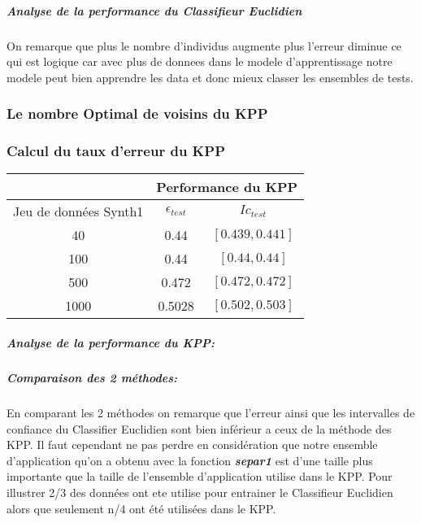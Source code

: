 \documentclass[10pt]{article}
\begin{document}
			\subparagraph{Analyse de la performance du Classifieur Euclidien}
			On remarque que plus le nombre d'individus augmente plus l'erreur diminue ce qui est logique car avec plus de donnees dans le modele d'apprentissage notre modele peut bien apprendre les data et donc mieux classer les ensembles de tests.
			 
				\subsubsection{Le nombre Optimal de voisins du KPP }
			
				\subsubsection{Calcul du taux d'erreur du KPP }
		\begin{center}		
			\begin{tabular}{ | c | c | c |}
				\rowcolor{lightgray} 
				  &  \multicolumn{2}{|c|}{Performance du KPP}\\
				
				\hline
				Jeu de données Synth1 &   $\epsilon_{test}$ &  $Ic_{test}$\\
				\hline
				\multirow{1}{*}{40}       &0.44  & $[0.439, 0.441]$ 			 \\
				
				\hline
				\multirow{1}{*}{100}      & 0.44	& $[0.44, 0.44]$  \\
				
				\hline
				\multirow{1}{*}{500}      &  0.472 & 	$[0.472, 0.472]$	\\
				
				\hline
				\multirow{1}{*}{1000}      & 0.5028   & 	$[0.502, 0.503 ]$ 		\\
				
				\hline
			\end{tabular}
		\end{center}
	
	\subparagraph{Analyse de la performance du KPP: }
	
	
			
			\subparagraph{Comparaison des 2 méthodes: } 
			 En comparant les 2 méthodes on remarque que l'erreur ainsi que les intervalles de confiance du Classifier Euclidien sont bien inférieur a ceux de la méthode des KPP. Il faut cependant ne pas perdre en considération que notre ensemble d'application qu'on a obtenu avec la fonction \textbf{\textit{separ1}} est d'une taille plus importante que la taille de l'ensemble d'application utilise dans le KPP. Pour illustrer 2/3 des données ont ete utilise pour entrainer le Classifieur Euclidien alors que seulement n/4 ont été utilisées dans le KPP.
	
\end{document}
